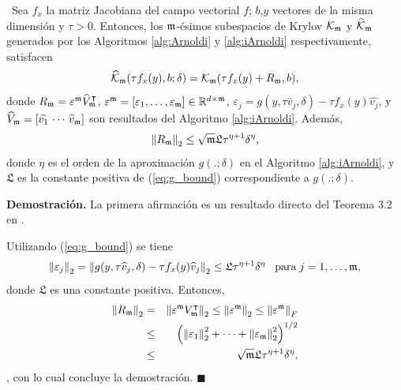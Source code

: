 \begin{theorem} \label{theorem:krilobapproxequality} \cite{naranjo2023jacobian}~Sea $f_x$ la matriz Jacobiana del campo vectorial $f$; $b$,$y$ vectores de la misma dimensión y $\tau>0$. Entonces, los $\mathfrak{m}$-ésimos subespacios de Krylov $\mathcal{K}_{\mathfrak{m}}$ y $\widehat{\mathcal{K}}_{\mathfrak{m}}$ generados por los Algoritmos \ref{alg:Arnoldi} y \ref{alg:iArnoldi} respectivamente, satisfacen
	\[ \widehat{\mathcal{K}}_{\mathfrak{m}}(\tau f_x(y),b;\delta) = \mathcal{K}_{\mathfrak{m}}(\tau f_x(y)+R_{\mathfrak{m}},b), \]
	donde $R_{\mathfrak{m}} =  \varepsilon^{\mathfrak{m}}\widehat{V}^\intercal_{\mathfrak{m}}$,
	$\varepsilon^{\mathfrak{m}} = [\varepsilon_1,\dots,\varepsilon_{\mathfrak{m}}] \in \mathbb{R}^{d\times \mathfrak{m}}$, $\varepsilon_j = g(y,\tau\widehat{v}_j,\delta)- \tau f_x(y)\widehat{v_j}$, y $\widehat{V}_{\mathfrak{m}}=[\widehat{v_1}\,\cdots \,\widehat{v}_{\mathfrak{m}}]$ son resultados del Algoritmo \ref{alg:iArnoldi}. Además,
	\[ \left\lVert R_{\mathfrak{m}} \right\rVert_2\leq \sqrt{\mathfrak{m}}\mathfrak{L} \tau^{\eta+1}\delta^{\eta}, \]
	donde $\eta$ es el orden de la aproximación $g(.;\delta)$ en el Algoritmo \ref{alg:iArnoldi}, y $\mathfrak{L}$ es la constante positiva de (\ref{eq:g_bound}) correspondiente a $g(.;\delta)$.
\end{theorem}
\textbf{Demostración.} La primera afirmación es un resultado directo del Teorema 3.2 en \cite{brown1987local}.

Utilizando  (\ref{eq:g_bound}) se tiene
\[ \left\lVert \varepsilon_j \right\rVert_2=\left\lVert g(y,\tau\widehat{v}_j,\delta)-\tau f_x(y)\widehat{v}_j \right\rVert_2 \leq  \mathfrak{L} \tau^{\eta+1}\delta^{\eta}\;\;\;\text{para}\;j=1,\dots,\mathfrak{m}, \]
donde $\mathfrak{L}$ es una constante positiva. Entonces,
\begin{eqnarray*}
	\left\lVert R_{\mathfrak{m}} \right\rVert_2 & = & \left\lVert \varepsilon^{\mathfrak{m}} V_{\mathfrak{m}}^\intercal \right\rVert_2\leq\left\lVert \varepsilon^{\mathfrak{m}} \right\rVert_2\leq \left\lVert \varepsilon^{\mathfrak{m}} \right\rVert_F \\
	& \leq & \left( \left\lVert \varepsilon_1 \right\rVert_2^2 + \cdots + \left\lVert \varepsilon_{\mathfrak{m}} \right\rVert_2^2 \right)^{1/2} \\
	& \leq & \sqrt{\mathfrak{m}}\mathfrak{L} \tau^{\eta+1}\delta^{\eta},
\end{eqnarray*}
, con lo cual concluye la demostración. $\blacksquare$\\

